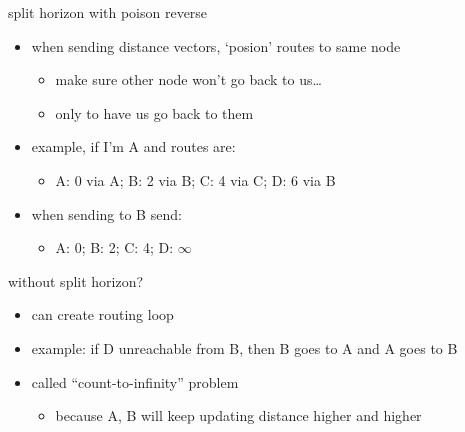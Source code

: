 \usetikzlibrary{arrows.meta,matrix}

\providecommand{\noroute}{$\infty$/---}
\providecommand{\mymark}[2]{\alt<#1->{\myemph<#1>{#2}}{}}

\begin{frame}{split horizon with poison reverse}
    \begin{itemize}
    \item when sending distance vectors, `posion' routes to same node
        \begin{itemize}
        \item make sure other node won't go back to us\ldots
        \item only to have us go back to them
        \end{itemize}
    \item example, if I'm A and routes are:
        \begin{itemize}
        \item A: 0 via A; B: 2 via B; C: 4 via C; D: 6 via B
        \end{itemize}
    \item when sending to B send:
        \begin{itemize}
        \item A: 0; B: 2; C: 4; D: $\infty$
        \end{itemize}
    \end{itemize}
\end{frame}

\begin{frame}{without split horizon?}
    \begin{itemize}
    \item can create routing loop
    \item example: if D unreachable from B, then B goes to A and A goes to B
    \vspace{.5cm}
    \item called ``count-to-infinity'' problem
        \begin{itemize}
        \item because A, B will keep updating distance higher and higher
        \end{itemize}
    \end{itemize}
\end{frame}

